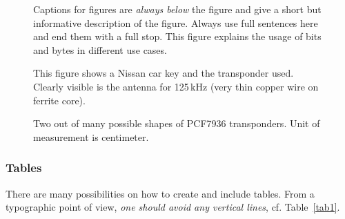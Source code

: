 \newpage
{}

\else

\begin{figure}[htbp]
	\centering
	\caption{Captions for figures are \emph{always below} the figure and give a short but informative description of the figure. Always use full sentences here and end them with a full stop. This figure explains the usage of bits and bytes in different use cases.}	
	\label{fig:emseclogo}
\end{figure}

\fi

\begin{figure}[p]
  \centering
  \hfill %
  \hfill %
  \caption{This figure shows a Nissan car key and the transponder used. Clearly visible is the antenna for 125\,kHz (very thin copper wire on ferrite core).}
  \label{fig:keys}
 \end{figure} %
\begin{figure}[p]
 \ContinuedFloat
  \centering
  \hfill %
  \hfill %
  \caption{Two out of many possible shapes of PCF7936 transponders. Unit of measurement is centimeter.}
\end{figure} %

\clearpage

\subsubsection{Tables}

There are many possibilities on how to create and include tables. From a typographic point of view, \textit{one should avoid any vertical lines}, cf. Table~\ref{tab1}.


